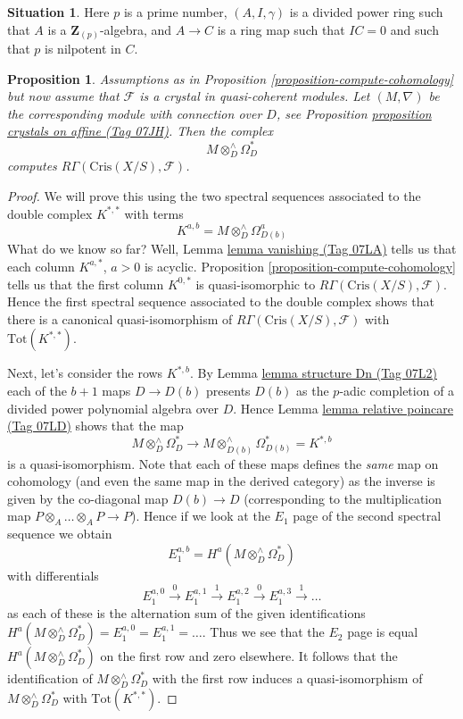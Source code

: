 \documentclass{amsart}
\theoremstyle{plain}
\newtheorem{proposition}[subsection]{Proposition}
\theoremstyle{definition}
\newtheorem{situation}[subsection]{Situation}
\theoremstyle{remark}
\numberwithin{equation}{subsection}
\begin{document}
\begin{situation}
\label{situation-affine}
Here $p$ is a prime number, $(A, I, \gamma)$ is a divided power
ring such that $A$ is a $\mathbf{Z}_{(p)}$-algebra, and $A \to C$ is a
ring map such that $IC = 0$ and such that $p$ is nilpotent in $C$.
\end{situation}

\begin{proposition}
\label{proposition-compute-cohomology-crystal}
Assumptions as in Proposition \ref{proposition-compute-cohomology}
but now assume that $\mathcal{F}$ is a crystal in quasi-coherent modules.
Let $(M, \nabla)$ be the corresponding module with connection over $D$, see
Proposition \href{https://stacks.math.columbia.edu/tag/07JH}{proposition crystals on affine (Tag 07JH)}. Then the complex
$$
M \otimes^\wedge_D \Omega^*_D
$$
computes $R\Gamma(\text{Cris}(X/S), \mathcal{F})$.
\end{proposition}

\begin{proof}
We will prove this using the two spectral sequences associated to the
double complex $K^{*, *}$ with terms
$$
K^{a, b} = M \otimes_D^\wedge \Omega^a_{D(b)}
$$
What do we know so far? Well, Lemma \href{https://stacks.math.columbia.edu/tag/07LA}{lemma vanishing (Tag 07LA)}
tells us that each column $K^{a, *}$, $a > 0$ is acyclic.
Proposition \ref{proposition-compute-cohomology} tells us that
the first column $K^{0, *}$ is quasi-isomorphic to
$R\Gamma(\text{Cris}(X/S), \mathcal{F})$.
Hence the first spectral sequence associated to the double complex
shows that there is a canonical quasi-isomorphism of
$R\Gamma(\text{Cris}(X/S), \mathcal{F})$ with
$\text{Tot}(K^{*, *})$.

\medskip\noindent
Next, let's consider the rows $K^{*, b}$. By
Lemma \href{https://stacks.math.columbia.edu/tag/07L2}{lemma structure Dn (Tag 07L2)}
each of the $b + 1$ maps $D \to D(b)$ presents $D(b)$ as the $p$-adic
completion of a divided power polynomial algebra over $D$.
Hence Lemma \href{https://stacks.math.columbia.edu/tag/07LD}{lemma relative poincare (Tag 07LD)} shows that the map
$$
M \otimes^\wedge_D\Omega^*_D
\longrightarrow
M \otimes^\wedge_{D(b)} \Omega^*_{D(b)} = K^{*, b}
$$
is a quasi-isomorphism. Note that each of these maps defines the {\it same}
map on cohomology (and even the same map in the derived category) as
the inverse is given by the co-diagonal map $D(b) \to D$ (corresponding
to the multiplication map $P \otimes_A \ldots \otimes_A P \to P$).
Hence if we look at the $E_1$ page of the second spectral sequence
we obtain
$$
E_1^{a, b} = H^a(M \otimes^\wedge_D\Omega^*_D)
$$
with differentials
$$
E_1^{a, 0} \xrightarrow{0}
E_1^{a, 1} \xrightarrow{1}
E_1^{a, 2} \xrightarrow{0}
E_1^{a, 3} \xrightarrow{1} \ldots
$$
as each of these is the alternation sum of the given identifications
$H^a(M \otimes^\wedge_D\Omega^*_D) = E_1^{a, 0} = E_1^{a, 1} = \ldots$.
Thus we see that the $E_2$ page is equal $H^a(M \otimes^\wedge_D\Omega^*_D)$
on the first row and zero elsewhere. It follows that the identification
of $M \otimes^\wedge_D\Omega^*_D$ with the first row induces a
quasi-isomorphism of $M \otimes^\wedge_D\Omega^*_D$ with
$\text{Tot}(K^{*, *})$.
\end{proof}
\end{document}
